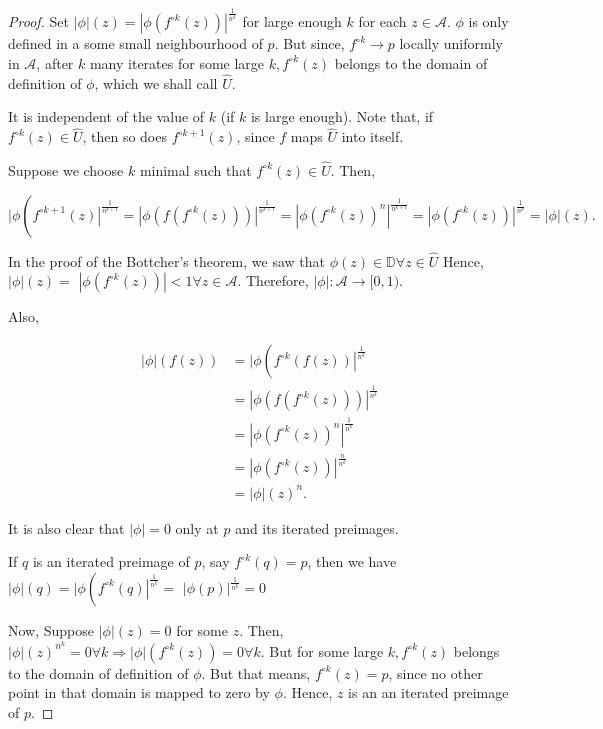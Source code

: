 \begin{proof}
Set $|\phi|(z)=\left|\phi\left(f^{\circ k}(z)\right)\right|^{\frac{1}{n^{k}}}$ for large enough $k$ for each $z \in \mathcal{A}$. $\phi$ is only defined in a some small neighbourhood of $p$. But since, $f^{\circ k} \rightarrow p$ locally uniformly in $\mathcal{A}$, after $k$ many iterates for some large $k, f^{\circ k}(z)$ belongs to the domain of definition of $\phi$, which we shall call $\hat{U}$.

It is independent of the value of $k$ (if $k$ is large enough). Note that, if $f^{\circ k}(z) \in \hat{U}$, then so does $f^{\circ k+1}(z)$, since $f$ maps $\hat{U}$ into itself.

Suppose we choose $k$ minimal such that $f^{\circ k}(z) \in \hat{U}$. Then,

$$
\mid \phi\left(\left.f^{\circ k+1}(z)\right|^{\frac{1}{n^{k+1}}}=\left|\phi\left(f\left(f^{\circ k}(z)\right)\right)\right|^{\frac{1}{n^{k+1}}}=\left|\phi\left(f^{\circ k}(z)\right)^{n}\right|^{\frac{1}{n^{k+1}}}=\left|\phi\left(f^{\circ k}(z)\right)\right|^{\frac{1}{n^{k}}}=|\phi|(z) .\right.
$$

In the proof of the Bottcher's theorem, we saw that $\phi(z) \in \mathbb{D} \forall z \in \hat{U}$ Hence, $|\phi|(z)=$ $\left|\phi\left(f^{\circ k}(z)\right)\right|<1 \forall z \in \mathcal{A}$. Therefore, $|\phi|: \mathcal{A} \rightarrow[0,1)$.

Also,

$$
\begin{aligned}
|\phi|(f(z)) & =\mid \phi\left(\left.f^{\circ k}(f(z))\right|^{\frac{1}{n^{k}}}\right. \\
& =\left|\phi\left(f\left(f^{\circ k}(z)\right)\right)\right|^{\frac{1}{n^{k}}} \\
& =\left|\phi\left(f^{\circ k}(z)\right)^{n}\right|^{\frac{1}{n^{k}}} \\
& =\left|\phi\left(f^{\circ k}(z)\right)\right|^{\frac{n}{n^{k}}} \\
& =|\phi|(z)^{n} .
\end{aligned}
$$

It is also clear that $|\phi|=0$ only at $p$ and its iterated preimages.

If $q$ is an iterated preimage of $p$, say $f^{\circ k}(q)=p$, then we have $|\phi|(q)=\mid \phi\left(\left.f^{\circ k}(q)\right|^{\frac{1}{n^{k}}}=\right.$ $|\phi(p)|^{\frac{1}{n^{k}}}=0$

Now, Suppose $|\phi|(z)=0$ for some $z$. Then, $|\phi|(z)^{n^{k}}=0 \forall k \Longrightarrow|\phi|\left(f^{\circ k}(z)\right)=0 \forall k$. But for some large $k, f^{\circ k}(z)$ belongs to the domain of definition of $\phi$. But that means, $f^{\circ k}(z)=p$, since no other point in that domain is mapped to zero by $\phi$. Hence, $z$ is an an iterated preimage of $p$.


\end{proof}
